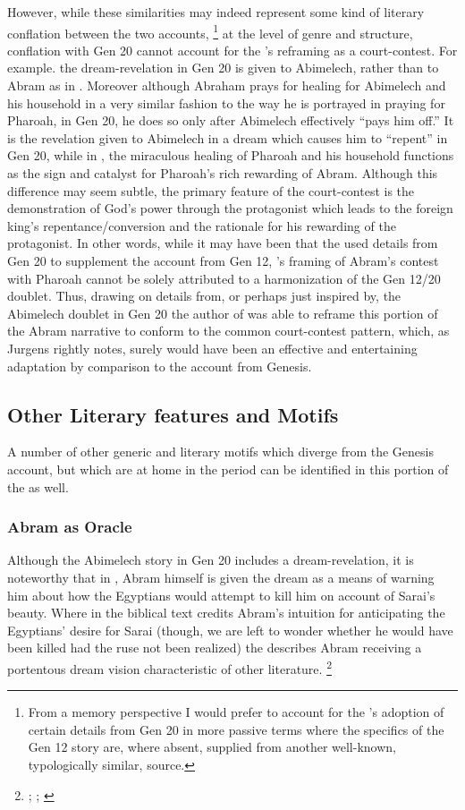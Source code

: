 However, while these similarities may indeed represent some kind of literary conflation between the two accounts,%
%
\footnote{From a memory perspective I would prefer to account for the \ga's adoption of certain details from Gen 20 in more passive terms where the specifics of the Gen 12 story are, where absent, supplied from another well-known, typologically similar, source.} 
%
at the level of genre and structure, conflation with Gen 20 cannot account for the \ga's reframing as a court-contest. For example. the dream-revelation in Gen 20 is given to Abimelech, rather than to Abram as in \ga. Moreover although Abraham prays for healing for Abimelech and his household in a very similar fashion to the way he is portrayed in \ga praying for Pharoah, in Gen 20, he does so only after Abimelech effectively ``pays him off.'' It is the revelation given to Abimelech in a dream which causes him to ``repent'' in Gen 20, while in \ga, the miraculous healing of Pharoah and his household functions as the sign and catalyst for Pharoah's rich rewarding of Abram. Although this difference may seem subtle, the primary feature of the court-contest is the demonstration of God's power through the protagonist which leads to the foreign king's repentance/conversion and the rationale for his rewarding of the protagonist. In other words, while it may have been that the \ga used details from Gen 20 to supplement the account from Gen 12, \ga's framing of Abram's contest with Pharoah cannot be solely attributed to a harmonization of the Gen 12/20 doublet. Thus, drawing on details from, or perhaps just inspired by, the Abimelech doublet in Gen 20  the author of \ga was able to reframe this portion of the Abram narrative to conform to the common court-contest pattern, which, as Jurgens rightly notes, surely would have been an effective and entertaining adaptation by comparison to the account from Genesis.

\subsection{Other Literary features and Motifs}
A number of other generic and literary motifs which diverge from the Genesis account, but which are at home in the \secondtemple period can be identified in this portion of the \ga as well.

\subsubsection{Abram as Oracle}
Although the Abimelech story in Gen 20 includes a dream-revelation, it is noteworthy that in \ga, Abram himself is given the dream as a means of warning him about how the Egyptians would attempt to kill him on account of Sarai's beauty. Where in the biblical text credits Abram's intuition for anticipating the Egyptians' desire for Sarai (though, we are left to wonder whether he would have been killed had the ruse not been realized) the \ga describes Abram receiving a portentous dream vision characteristic of other \secondtemple literature.%
%
\footnote{\cite{gevirtz_maarav1992}; \cite[184]{fitzmyer2004}; \cite{dacy_tzoref2013}}
%

